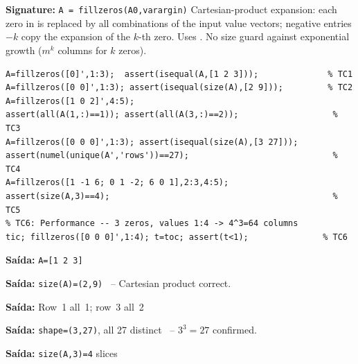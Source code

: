 \chapter{}
\begin{tcolorbox}[Abox,title={Analysis}]
\textbf{Signature:} \lstinline|A = fillzeros(A0,varargin)|\quad
Cartesian-product expansion: each zero in  is replaced by all combinations of the input value vectors; negative entries $-k$ copy the expansion of the $k$-th zero. Uses . No size guard against exponential growth ($m^k$ columns for $k$ zeros).
\end{tcolorbox}
\begin{lstlisting}[caption={Tests for fillzeros.m}]
A=fillzeros([0]',1:3);  assert(isequal(A,[1 2 3]));              % TC1
A=fillzeros([0 0]',1:3); assert(isequal(size(A),[2 9]));         % TC2
A=fillzeros([1 0 2]',4:5);
assert(all(A(1,:)==1)); assert(all(A(3,:)==2));                   % TC3
A=fillzeros([0 0 0]',1:3); assert(isequal(size(A),[3 27]));
assert(numel(unique(A','rows'))==27);                             % TC4
A=fillzeros([1 -1 6; 0 1 -2; 6 0 1],2:3,4:5);
assert(size(A,3)==4);                                             % TC5
% TC6: Performance -- 3 zeros, values 1:4 -> 4^3=64 columns
tic; fillzeros([0 0 0]',1:4); t=toc; assert(t<1);               % TC6
\end{lstlisting}
\begin{tcolorbox}[Pbox,title={TC1 -- Single zero, 3 values}]
\textbf{Saída:} \texttt{A=[1 2 3]} \quad \APROVADO
\end{tcolorbox}
\begin{tcolorbox}[Pbox,title={TC2 -- Two zeros, $3\times3=9$ columns}]
\textbf{Saída:} \texttt{size(A)=(2,9)} \quad \APROVADO\ -- Cartesian product correct.
\end{tcolorbox}
\begin{tcolorbox}[Pbox,title={TC3 -- Non-zero entries preserved}]
\textbf{Saída:} Row~1 all~1; row~3 all~2 \quad \APROVADO
\end{tcolorbox}
\begin{tcolorbox}[Pbox,title={TC4 -- All 27 endomaps of $\{1,2,3\}$}]
\textbf{Saída:} \texttt{shape=(3,27)}, all 27 distinct \quad \APROVADO\ -- $3^3=27$ confirmed.
\end{tcolorbox}
\begin{tcolorbox}[Pbox,title={TC5 -- Negative markers (copy references)}]
\textbf{Saída:} \texttt{size(A,3)=4} slices \quad \APROVADO
\end{tcolorbox}
